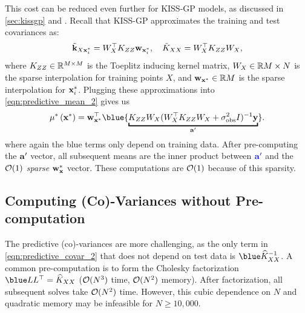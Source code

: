 This cost can be reduced even further for KISS-GP models, as discussed in \cref{sec:kissgp} and \citep{wilson2015thoughts}.
Recall that KISS-GP approximates the training and test covariances as:
%
\begin{align*}
  \tilde{\mathbf{k}}_{X \mathbf{x}^*_i} = W^\top_{X} K_{Z Z} \mathbf{w}_{\mathbf{x}^*_i},
  \quad
  \tilde{K}_{X X} = W^\top_{X} K_{Z Z} W_{X},
\end{align*}
%
where $K_{ZZ} \in \mathbb{R}^{M \times M}$ is the Toeplitz inducing kernel matrix, $W_{X} \in \mathbb{R}{M \times N}$ is the sparse interpolation for training points $X$, and $\mathbf{w}_{\mathbf{x}^*} \in \mathbb{R}{M}$ is the sparse interpolation for $\mathbf{x}^*_i$.
Plugging these approximations into \cref{eqn:predictive_mean_2} gives us
\[
  \meantest{\bxtest} = \bw_{\bxtest}^\top {\blue{\underbracket{\bK_{\bZ\bZ} \bW_{\bX}(\bW_{\bX}^{\top}\bK_{\bZ\bZ}\bW_{\bX} + \sigma_\text{obs}^{2} \bI)^{-1} \by}_{\ba'}}}.
\]
where again the blue terms only depend on training data.
After pre-computing the $\mathbf{a}'$ vector, all subsequent means are the inner product between $\color{blue} \mathbf{a}'$ and the \emph{$\bigo{1}$ sparse} $\bw_\bxtest$ vector.
These computations are $\bigo{1}$ because of this sparsity.

\subsection{Computing (Co)-Variances without Pre-computation}

The predictive (co)-variances are more challenging, as the only term in \cref{eqn:predictive_covar_2} that does not depend on test data is $\blue \trainK^{-1}$.
A common pre-computation is to form the Cholesky factorization $\blue \bL \bL^\top = \trainK$ ($\bigo{N^3}$ time, $\bigo{N^2}$ memory).
After factorization, all subsequent solves take $\bigo{N^2}$ time.
However, this cubic dependence on $N$ and quadratic memory may be infeasible for $N \geq 10,\!000$.


